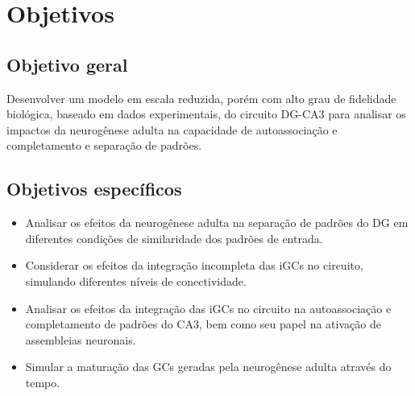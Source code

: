 \chapter{Objetivos}

\section{Objetivo geral}

Desenvolver um modelo em escala reduzida, porém com alto grau de fidelidade biológica, baseado em dados experimentais, do circuito
DG-CA3 para analisar os impactos da neurogênese adulta na capacidade de autoassociação e completamento e separação de padrões.

\section{Objetivos específicos}

\begin{itemize}
    \item Analisar os efeitos da neurogênese adulta na separação de padrões do DG em diferentes condições de similaridade dos
    padrões de entrada.
    \item Considerar os efeitos da integração incompleta das iGCs no circuito, simulando diferentes níveis de conectividade.
    \item Analisar os efeitos da integração das iGCs no circuito na autoassociação e completamento de padrões do CA3, bem como
    seu papel na ativação de assembleias neuronais.
    \item Simular a maturação das GCs geradas pela neurogênese adulta através do tempo.
\end{itemize}
